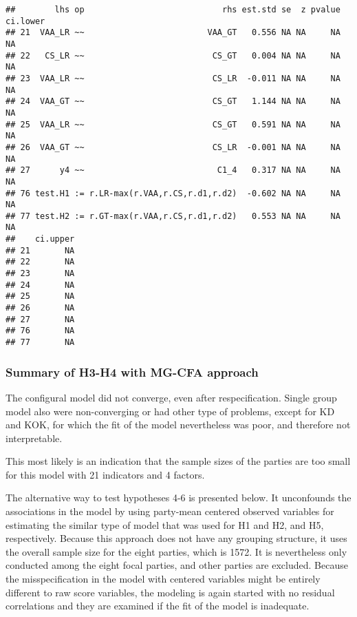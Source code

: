 \documentclass[
]{article}
\begin{document}
\begin{verbatim}
##        lhs op                            rhs est.std se  z pvalue ci.lower
## 21  VAA_LR ~~                         VAA_GT   0.556 NA NA     NA       NA
## 22   CS_LR ~~                          CS_GT   0.004 NA NA     NA       NA
## 23  VAA_LR ~~                          CS_LR  -0.011 NA NA     NA       NA
## 24  VAA_GT ~~                          CS_GT   1.144 NA NA     NA       NA
## 25  VAA_LR ~~                          CS_GT   0.591 NA NA     NA       NA
## 26  VAA_GT ~~                          CS_LR  -0.001 NA NA     NA       NA
## 27      y4 ~~                           C1_4   0.317 NA NA     NA       NA
## 76 test.H1 := r.LR-max(r.VAA,r.CS,r.d1,r.d2)  -0.602 NA NA     NA       NA
## 77 test.H2 := r.GT-max(r.VAA,r.CS,r.d1,r.d2)   0.553 NA NA     NA       NA
##    ci.upper
## 21       NA
## 22       NA
## 23       NA
## 24       NA
## 25       NA
## 26       NA
## 27       NA
## 76       NA
## 77       NA
\end{verbatim}

\newpage

\hypertarget{summary-of-h3-h4-with-mg-cfa-approach}{%
\subsubsection{Summary of H3-H4 with MG-CFA
approach}\label{summary-of-h3-h4-with-mg-cfa-approach}}

The configural model did not converge, even after respecification.
Single group model also were non-converging or had other type of
problems, except for KD and KOK, for which the fit of the model
nevertheless was poor, and therefore not interpretable.

This most likely is an indication that the sample sizes of the parties
are too small for this model with 21 indicators and 4 factors.

The alternative way to test hypotheses 4-6 is presented below. It
unconfounds the associations in the model by using party-mean centered
observed variables for estimating the similar type of model that was
used for H1 and H2, and H5, respectively. Because this approach does not
have any grouping structure, it uses the overall sample size for the
eight parties, which is 1572. It is nevertheless only conducted among
the eight focal parties, and other parties are excluded. Because the
misspecification in the model with centered variables might be entirely
different to raw score variables, the modeling is again started with no
residual correlations and they are examined if the fit of the model is
inadequate.
\end{document}

